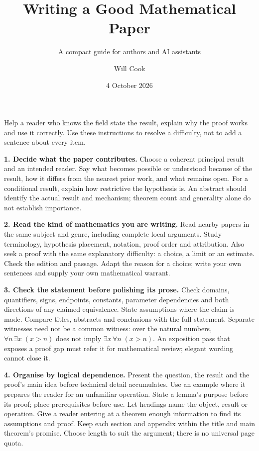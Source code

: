 \documentclass[10pt]{article}
\title{Writing a Good Mathematical Paper}
\subtitle{A compact guide for authors and AI assistants}
\author{Will Cook}
\date{4 October 2026}
\newcommand{\instruction}[2]{\par\medskip\noindent\textbf{#1.} #2\par}
\begin{document}
\maketitle
\paperprovenance
{}
Help a reader who knows the field state the result, explain why the proof works
and use it correctly. Use these instructions to resolve a difficulty, not to
add a sentence about every item.

\instruction{1. Decide what the paper contributes}{
Choose a coherent principal result and an intended reader. Say what becomes
possible or understood because of the result, how it differs from the nearest
prior work, and what remains open. For a conditional result, explain how
restrictive the hypothesis is. An abstract should identify the actual result
and mechanism; theorem count and generality alone do not establish importance.}

\instruction{2. Read the kind of mathematics you are writing}{
Read nearby papers in the same subject and genre, including complete local
arguments. Study terminology, hypothesis placement, notation, proof order and
attribution. Also seek a proof with the same explanatory difficulty: a choice,
a limit or an estimate. Check the edition and passage. Adapt the reason for a
choice; write your own sentences and supply your own mathematical warrant.}

\instruction{3. Check the statement before polishing its prose}{
Check domains, quantifiers, signs, endpoints, constants, parameter dependencies
and both directions of any claimed equivalence. State assumptions where the
claim is made. Compare titles, abstracts and conclusions with the full statement.
Separate witnesses need not be a common witness: over the natural numbers,
$\forall n\,\exists x\;(x>n)$ does not imply
$\exists x\,\forall n\;(x>n)$. An exposition pass that exposes a proof gap must
refer it for mathematical review; elegant wording cannot close it.}

\instruction{4. Organise by logical dependence}{
Present the question, the result and the proof's main idea before technical
detail accumulates. Use an example where it prepares the reader for an unfamiliar
operation. State a lemma's purpose before its proof; place prerequisites before
use. Let headings name the object, result or operation. Give a reader entering
at a theorem enough information to find its assumptions and proof. Keep each section and appendix within the title and main theorem's promise.
Choose length to suit the argument; there is no universal page quota.}
\end{document}
